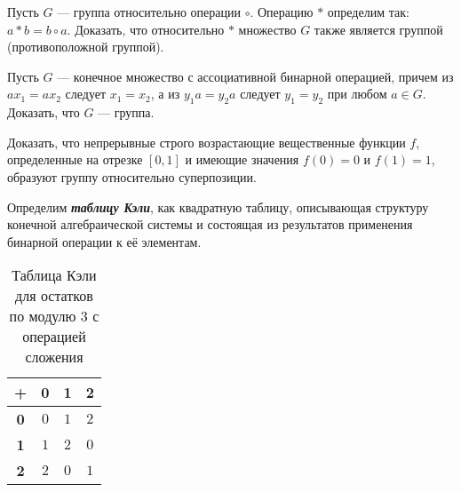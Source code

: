 \documentclass{article}
\begin{document}
    \begin{task_boxed}
        Пусть $G$ — группа относительно операции $\circ$.
        Операцию $*$ определим так: $a * b = b \circ a$.
        Доказать, что
        относительно $*$ множество $G$ также является группой (противоположной группой).
    \end{task_boxed}

    \begin{task_boxed}
        Пусть $G$ — конечное множество с ассоциативной бинарной операцией, причем из $ax_1 = ax_2$ следует $x_1 = x_2$,
        а из $y_{1}a = y_{2}a$ следует $y_1 = y_2$ при любом $a \in G$.
        Доказать, что $G$ — группа.
    \end{task_boxed}

    \begin{task_boxed}
        Доказать, что непрерывные строго возрастающие вещественные функции $f$, определенные на отрезке $[0,1]$
        и имеющие значения $f(0) = 0$ и $f(1) = 1$, образуют группу относительно суперпозиции.
    \end{task_boxed}

    \begin{definition_boxed}

        Определим \textbf{\textit{таблицу Кэли}}, как квадратную таблицу, описывающая структуру конечной алгебраической системы и состоящая из результатов применения бинарной операции к её элементам.
    \end{definition_boxed}

    \begin{example}
        \begin{table}[h]
            \label{tab:table-2}
            \centering
            \begin{tabular}{|c|c|c|c|}
                \hline
                \textbf{+} & \textbf{0} & \textbf{1} & \textbf{2} \\\hline
                \textbf{0} & $0$        & $1$        & $2$        \\\hline
                \textbf{1} & $1$        & $2$        & $0$        \\\hline
                \textbf{2} & $2$        & $0$        & $1$        \\\hline
            \end{tabular}
            \caption{Таблица Кэли для остатков по модулю 3 с операцией сложения}
        \end{table}
    \end{example}
\end{document}
